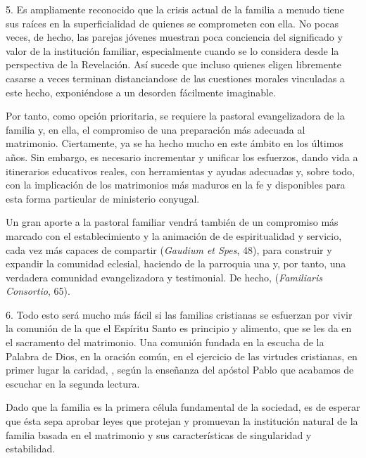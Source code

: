 \begin{body}
					5. Es ampliamente reconocido que la crisis actual de la familia a menudo tiene sus raíces en la superficialidad de quienes se comprometen con ella. No pocas veces, de hecho, las parejas jóvenes muestran poca conciencia del significado y valor de la institución familiar, especialmente cuando se lo considera desde la perspectiva de la Revelación. Así sucede que incluso quienes eligen libremente casarse  a veces terminan distanciandose de las cuestiones morales vinculadas a este hecho, exponiéndose a un desorden fácilmente imaginable.
					
					Por tanto, como opción prioritaria, se requiere la pastoral evangelizadora de la familia y, en ella, el compromiso de una preparación más adecuada al matrimonio. Ciertamente, ya se ha hecho mucho en este ámbito en los últimos años. Sin embargo, es necesario incrementar y unificar los esfuerzos, dando vida a itinerarios educativos reales, con herramientas y ayudas adecuadas y, sobre todo, con la implicación de los matrimonios más maduros en la fe y disponibles para esta forma particular de ministerio conyugal.
					
					Un gran aporte a la pastoral familiar vendrá también de un compromiso más marcado con el establecimiento y la animación de  de espiritualidad y servicio, cada vez más capaces de compartir  (\emph{Gaudium et Spes}, 48), para construir y expandir la comunidad eclesial, haciendo de la parroquia una  y, por tanto, una verdadera comunidad evangelizadora y testimonial. De hecho,  (\emph{Familiaris Consortio}, 65).
					
					6. Todo esto será mucho más fácil si las familias cristianas se esfuerzan por vivir la comunión de la que el Espíritu Santo es principio y alimento, que se les da en el sacramento del matrimonio. Una comunión fundada en la escucha de la Palabra de Dios, en la oración común, en el ejercicio de las virtudes cristianas, en primer lugar la caridad, , según la enseñanza del apóstol Pablo que acabamos de escuchar en la segunda lectura.
					
					Dado que la familia es la primera célula fundamental de la sociedad, es de esperar que ésta sepa aprobar leyes que protejan y promuevan la institución natural de la familia basada en el matrimonio y sus características de singularidad y estabilidad.
					

\end{body}
